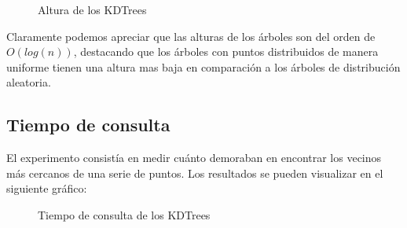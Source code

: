 \documentclass[12pt,letterpaper, margin = 3cm]{article}
\begin{document}
\begin{figure}[ht!]
 \centering
{}
 \caption{Altura de los KDTrees}
\end{figure}

Claramente podemos apreciar que las alturas de los árboles son del orden de $O(log(n))$, destacando que los árboles con puntos distribuidos de manera uniforme tienen una altura mas baja en comparación a los árboles de distribución aleatoria.
\newpage
\subsection{Tiempo de consulta}
El experimento consistía en medir cuánto demoraban en encontrar los vecinos más cercanos de una serie de puntos. Los resultados se pueden visualizar en el siguiente gráfico:

\begin{figure}[ht!]
 \centering
{}
 \caption{Tiempo de consulta de los KDTrees}
\end{figure}
\end{document}
